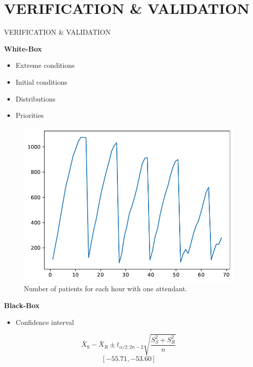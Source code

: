 \section{VERIFICATION \& VALIDATION}
\begin{frame}{VERIFICATION \& VALIDATION}
    \citep[Ch. 12]{robinson2004simulation}
    \begin{multicols}{2}
        \textbf{White-Box}
        \begin{itemize}
            \item Extreme conditions
            \item Initial conditions
            \item Distributions
            \item Priorities
        \end{itemize}
        \begin{figure}
            \centering
            \includegraphics[scale=.35]{images/validation.pdf}
            \caption{Number of patients for each hour with one attendant.}
        \end{figure}
        \columnbreak
        \textbf{Black-Box}
        \begin{itemize}
            \item Confidence interval
        \end{itemize}
                
        \begin{equation*}
        \bar{X}_{\mathrm{S}}-\bar{X}_{R} \pm t_{\alpha / 2; 2 n-2} \sqrt{\frac{S_{S}^{2}+S_{R}^{2}}{n}}
        \end{equation*}
         \[[-55.71, -53.60]\]
    \end{multicols}
\end{frame}